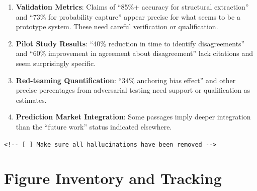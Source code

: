 \documentclass[
  11pt,
  letterpaper,
]{book}
\begin{document}
\begin{enumerate}
\def\labelenumi{\arabic{enumi}.}
\item
  \textbf{Validation Metrics}: Claims of ``85\%+ accuracy for structural
  extraction'' and ``73\% for probability capture'' appear precise for
  what seems to be a prototype system. These need careful verification
  or qualification.
\item
  \textbf{Pilot Study Results}: ``40\% reduction in time to identify
  disagreements'' and ``60\% improvement in agreement about
  disagreement'' lack citations and seem surprisingly specific.
\item
  \textbf{Red-teaming Quantification}: ``34\% anchoring bias effect''
  and other precise percentages from adversarial testing need support or
  qualification as estimates.
\item
  \textbf{Prediction Market Integration}: Some passages imply deeper
  integration than the ``future work'' status indicated elsewhere.
\end{enumerate}

\texttt{\textless{}!-\/-\ {[}\ {]}\ Make\ sure\ all\ hallucinations\ have\ been\ removed\ -\/-\textgreater{}}

\section{Figure Inventory and
Tracking}\label{figure-inventory-and-tracking}
\end{document}
